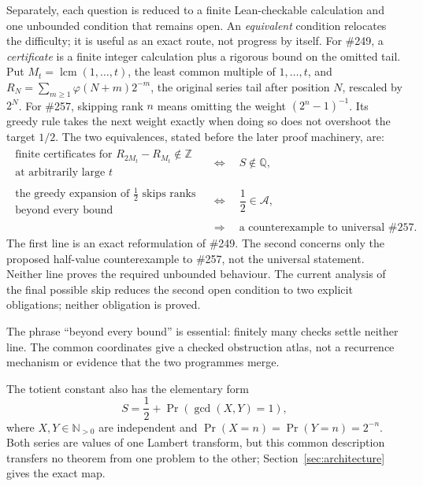 \documentclass[11pt]{article}
\theoremstyle{definition}
\theoremstyle{remark}
\newcommand{\Npos}{\mathbb{N}_{>0}}
\newcommand{\Z}{\mathbb{Z}}
\newcommand{\Q}{\mathbb{Q}}
\newcommand{\ph}{\varphi}
\newcommand{\lcm}{\operatorname{lcm}}
\begin{document}
Separately, each question is reduced to a finite Lean-checkable calculation and
one unbounded condition that remains open.  An \emph{equivalent} condition
relocates the difficulty; it is useful as an exact route, not progress by
itself.  For \#249, a \emph{certificate} is a
finite integer calculation plus a rigorous bound on the omitted tail.  Put
\(M_t=\lcm(1,\ldots,t)\), the least common multiple of \(1,\ldots,t\), and
\(R_N=\sum_{m\geq1}\ph(N+m)2^{-m}\), the original series tail after
position \(N\), rescaled by \(2^N\).  For \#257, skipping rank \(n\) means
omitting the weight \((2^n-1)^{-1}\).  Its greedy rule takes the next weight
exactly when doing so does not overshoot the target \(1/2\).
\noindent The two equivalences, stated before the later proof
machinery, are:
\[
 \begin{aligned}
 \substack{\text{finite certificates for }R_{2M_t}-R_{M_t}\notin\Z\\
   \text{at arbitrarily large }t}
 &\quad\Longleftrightarrow\quad S\notin\Q,\\[4pt]
 \substack{\text{the greedy expansion of }\tfrac12\text{ skips ranks}\\
   \text{beyond every bound}}
 &\quad\Longleftrightarrow\quad \dfrac12\in\mathcal A,\\[-1pt]
 &\quad\Longrightarrow\quad \text{a counterexample to universal \#257}.
 \end{aligned}
\]
The first line is an exact reformulation of \#249.  The second concerns only
the proposed half-value counterexample to \#257, not the universal statement.
Neither line proves the required unbounded behaviour.  The current analysis
of the final possible skip reduces the second open condition to two explicit
obligations; neither obligation is proved.

The phrase ``beyond every bound'' is essential: finitely many checks settle
neither line.  The common coordinates give a checked obstruction atlas, not a
recurrence mechanism or evidence that the two programmes merge.

The totient constant also has the elementary form
\[
 S=\frac12+\Pr(\gcd(X,Y)=1),
\]
where \(X,Y\in\Npos\) are independent and
\(\Pr(X=n)=\Pr(Y=n)=2^{-n}\).  Both series are values of one Lambert
transform, but this common description transfers no theorem from one problem
to the other; Section~\ref{sec:architecture} gives the exact map.
\end{document}
